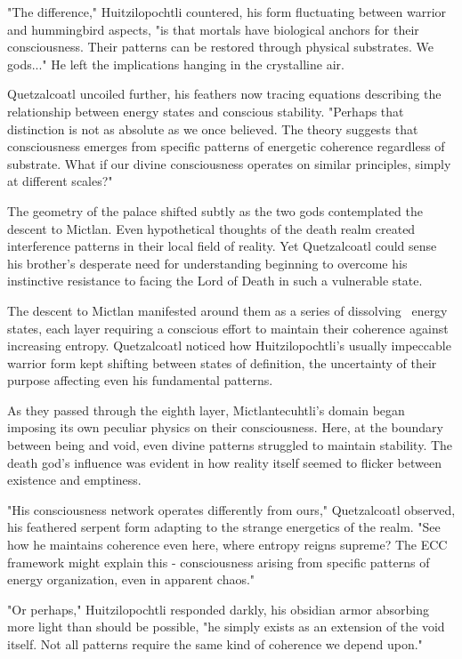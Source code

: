 "The difference," Huitzilopochtli countered, his form fluctuating between warrior and hummingbird aspects, "is that mortals have biological anchors for their consciousness. Their patterns can be restored through physical substrates. We gods..." He left the implications hanging in the crystalline air.

Quetzalcoatl uncoiled further, his feathers now tracing equations describing the relationship between energy states and conscious stability. "Perhaps that distinction is not as absolute as we once believed. The theory suggests that consciousness emerges from specific patterns of energetic coherence regardless of substrate. What if our divine consciousness operates on similar principles, simply at different scales?"

The geometry of the palace shifted subtly as the two gods contemplated the descent to Mictlan. Even hypothetical thoughts of the death realm created interference patterns in their local field of reality. Yet Quetzalcoatl could sense his brother's desperate need for understanding beginning to overcome his instinctive resistance to facing the Lord of Death in such a vulnerable state.

The descent to Mictlan manifested around them as a series of dissolving~ energy states, each layer requiring a conscious effort to maintain their coherence against increasing entropy. Quetzalcoatl noticed how Huitzilopochtli's usually impeccable warrior form kept shifting between states of definition, the uncertainty of their purpose affecting even his fundamental patterns.

As they passed through the eighth layer, Mictlantecuhtli's domain began imposing its own peculiar physics on their consciousness. Here, at the boundary between being and void, even divine patterns struggled to maintain stability. The death god's influence was evident in how reality itself seemed to flicker between existence and emptiness.

"His consciousness network operates differently from ours," Quetzalcoatl observed, his feathered serpent form adapting to the strange energetics of the realm. "See how he maintains coherence even here, where entropy reigns supreme? The ECC framework might explain this - consciousness arising from specific patterns of energy organization, even in apparent chaos."

"Or perhaps," Huitzilopochtli responded darkly, his obsidian armor absorbing more light than should be possible, "he simply exists as an extension of the void itself. Not all patterns require the same kind of coherence we depend upon."

